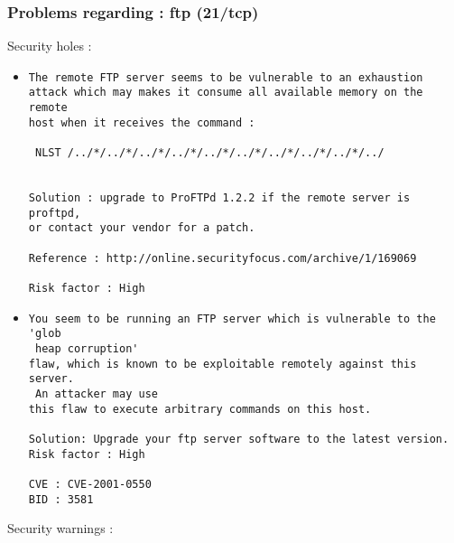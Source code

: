 \documentclass{article}
\begin{document}
\subsubsection{Problems regarding : ftp (21/tcp)}
Security holes :\\
\begin{itemize}
\item \begin{verbatim}
The remote FTP server seems to be vulnerable to an exhaustion
attack which may makes it consume all available memory on the remote
host when it receives the command :

 NLST /../*/../*/../*/../*/../*/../*/../*/../*/../*/../ 
 

Solution : upgrade to ProFTPd 1.2.2 if the remote server is proftpd,
or contact your vendor for a patch.

Reference : http://online.securityfocus.com/archive/1/169069

Risk factor : High
\end{verbatim}\item \begin{verbatim}
You seem to be running an FTP server which is vulnerable to the 'glob
 heap corruption'
flaw, which is known to be exploitable remotely against this server.
 An attacker may use 
this flaw to execute arbitrary commands on this host.

Solution: Upgrade your ftp server software to the latest version.
Risk factor : High

CVE : CVE-2001-0550
BID : 3581
\end{verbatim}\end{itemize}
Security warnings :\\
\end{document}
